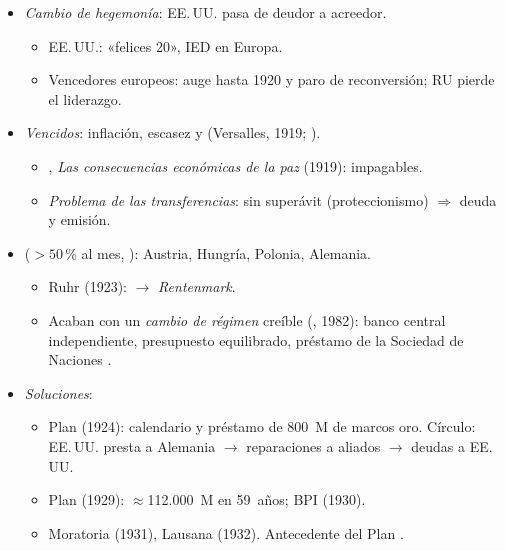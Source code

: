 \documentclass{article}
\begin{document}
\begin{columnas}
\begin{itemize}
\item \emph{Cambio de hegemonía}: EE.\,UU. pasa de deudor a acreedor.
  \begin{itemize}
  \item EE.\,UU.: «felices 20», IED en Europa.
  \item Vencedores europeos: auge hasta 1920 y paro de reconversión; RU pierde el liderazgo.
  \end{itemize}
\item \emph{Vencidos}: inflación, escasez y  (Versalles, 1919; ).
  \begin{itemize}
  \item {}, \emph{Las consecuencias económicas de la paz} (1919): impagables.
  \item \emph{Problema de las transferencias}: sin superávit (proteccionismo) $\Rightarrow$ deuda y emisión.
  \end{itemize}
\item {} ($>50$\,\% al mes, ): Austria, Hungría, Polonia, Alemania.
  \begin{itemize}
  \item Ruhr (1923):  $\to$ \emph{Rentenmark}.
  \item Acaban con un \emph{cambio de régimen} creíble (, 1982): banco central independiente, presupuesto equilibrado, préstamo de la Sociedad de Naciones .
  \end{itemize}
\end{itemize}
\begin{itemize}
\item \emph{Soluciones}:
  \begin{itemize}
  \item Plan  (1924): calendario y préstamo de 800~M de marcos oro. Círculo: EE.\,UU. presta a Alemania $\to$ reparaciones a aliados $\to$ deudas a EE.\,UU.
  \item Plan  (1929): $\approx$112.000~M en 59~años; BPI (1930).
  \item Moratoria  (1931), Lausana (1932). Antecedente del Plan  .

\end{itemize}
\end{itemize}
\end{columnas}
\end{document}
